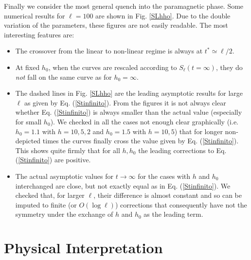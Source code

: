 \documentclass[12pt,preprint,tighten,eqsecnum,aps,floats,psfig,epsfig,amsmath,onecolumn]{revtex4-1}
\begin{document}
Finally we consider the most general quench into the paramagnetic phase.
Some numerical results for $\ell=100$ are shown in Fig. \ref{SLhho}. 
Due to the double variation of the parameters, these figures are not easily 
readable. The most interesting features are:
\begin{itemize}
\item The crossover from the linear to non-linear regime is 
always at $t^*\simeq \ell/2$.

\item At fixed $h_0$, when the curves are rescaled according to 
$S_\ell(t=\infty)$, they do {\em not} fall on the same curve as for $h_0=\infty$.


\item The dashed lines in Fig. \ref{SLhho} are the leading asymptotic results
for large $\ell$ as given by Eq. (\ref{Stinfinito}).
From the figures it is not always clear whether Eq. (\ref{Stinfinito}) is 
always smaller than the actual value (especially for small $h_0$).
We checked in all the cases not enough clear graphically (i.e. $h_0=1.1$ with
$h=10,5,2$ and $h_0=1.5$ with $h=10,5$) that for longer non-depicted times
the curves finally cross the value given by Eq. (\ref{Stinfinito}).
This shows quite firmly that for all $h,h_0$ the leading corrections to 
Eq. (\ref{Stinfinito}) are positive.
\item The actual asymptotic values for $t\rightarrow\infty$ for the cases 
with $h$ and $h_0$ interchanged are close, but not exactly equal as in 
Eq. (\ref{Stinfinito}). 
We checked that, for larger $\ell$, their difference is almost constant and 
so can be imputed to finite (or $O(\log \ell)$) corrections that consequently 
have not the symmetry under the exchange of $h$ and $h_0$ as the leading term.
\end{itemize}

\section{Physical Interpretation}
\label{arg}
\end{document}
